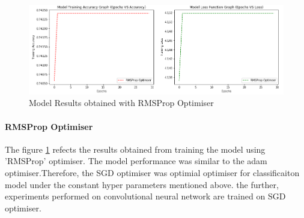 \begin{figure}[!htp]
    \centering
    \includegraphics[width=15cm]{Images/rmsprop.png}
    \caption{Model Results obtained with RMSProp Optimiser}
    \label{fig:rms}
\end{figure}

\paragraph{RMSProp Optimiser}
The figure \ref{fig:rms} refects the results obtained from training the model using 'RMSProp' optimiser. The model performance was similar to 
the adam optimiser.Therefore, the SGD optimiser was optimial optimiser for classificaiton model under the constant hyper parameters mentioned above.
the further, experiments performed on convolutional neural network are trained on SGD optimiser.


